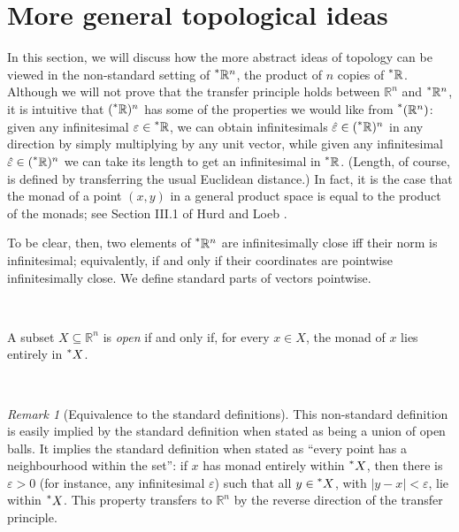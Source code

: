 \documentclass[11pt]{amsart}
\theoremstyle{remark}
\newtheorem*{remark}{Remark}
\newcommand{\hyp}[1][\mathbb{R}]{\prescript{*}{}{#1}}
\begin{document}
\section{More general topological ideas}

In this section, we will discuss how the more abstract ideas of topology can be viewed in the non-standard setting of $\hyp^n$, the product of $n$ copies of $\hyp$.
Although we will not prove that the transfer principle holds between $\mathbb{R}^n$ and $\hyp^n$, it is intuitive that $(\hyp)^n$ has some of the properties we would like from $\hyp[(\mathbb{R}^n)]$: given any infinitesimal $\varepsilon \in \hyp$, we can obtain infinitesimals $\hat{\varepsilon} \in (\hyp)^n$ in any direction by simply multiplying by any unit vector, while given any infinitesimal $\hat{\varepsilon} \in (\hyp)^n$ we can take its length to get an infinitesimal in $\hyp$.
(Length, of course, is defined by transferring the usual Euclidean distance.)
In fact, it is the case that the monad of a point $(x, y)$ in a general product space is equal to the product of the monads; see Section III.1 of Hurd and Loeb \cite{hurdloeb}. 

To be clear, then, two elements of $\hyp^n$ are infinitesimally close iff their norm is infinitesimal; equivalently, if and only if their coordinates are pointwise infinitesimally close.
We define standard parts of vectors pointwise.

\

\begin{defn} \label{defn:open}
A subset $X \subseteq \mathbb{R}^n$ is \emph{open} if and only if, for every $x \in X$, the monad of $x$ lies entirely in $\hyp[X]$.
\end{defn}

\

\begin{remark}[Equivalence to the standard definitions]
This non-standard definition is easily implied by the standard definition when stated as being a union of open balls.
It implies the standard definition when stated as ``every point has a neighbourhood within the set'':
if $x$ has monad entirely within $\hyp[X]$, then there is $\varepsilon > 0$ (for instance, any infinitesimal $\varepsilon$) such that all $y \in \hyp[X]$, with $|y-x| < \varepsilon$, lie within $\hyp[X]$.
This property transfers to $\mathbb{R}^n$ by the reverse direction of the transfer principle.
\end{remark}

\
\end{document}
